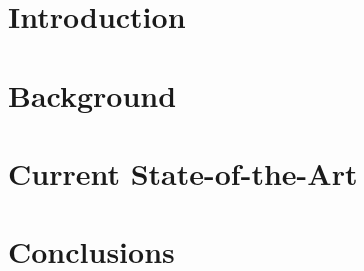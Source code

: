 \documentclass[a4paper 12pt]{article}
\begin{document}



\tableofcontents
\clearpage
\section{Introduction}

\section{Background}




\section{Current State-of-the-Art}







\section{Conclusions}

\clearpage
\printbibliography
\end{document}
